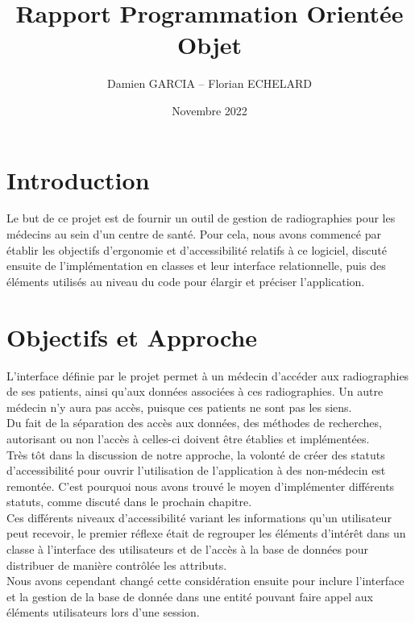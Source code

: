 \documentclass[12pt,a4paper]{article}
\begin{document}
	\title{Rapport Programmation Orientée Objet}
	\author{Damien GARCIA -- Florian ECHELARD}
	\date{Novembre 2022}
	\maketitle

	\begin{multicols}{2}

		\section{Introduction}	
		Le but de ce projet est de fournir un outil de gestion de radiographies pour les médecins au sein d'un centre de santé. Pour cela, nous avons commencé par établir les objectifs d'ergonomie et d'accessibilité relatifs à ce logiciel, discuté ensuite de l'implémentation en classes et leur interface relationnelle, puis des éléments utilisés au niveau du code pour élargir et préciser l'application.

		\section{Objectifs et Approche}
		L'interface définie par le projet permet à un médecin d'accéder aux radiographies de ses patients, ainsi qu'aux données associées à ces radiographies. Un autre médecin n'y aura pas accès, puisque ces patients ne sont pas les siens. \\
				
		Du fait de la séparation des accès aux données, des méthodes de recherches, autorisant ou non l'accès à celles-ci doivent être établies et implémentées. \\
				
		Très tôt dans la discussion de notre approche, la volonté de créer des statuts d'accessibilité pour ouvrir l'utilisation de l'application à des non-médecin est remontée. C'est pourquoi nous avons trouvé le moyen d'implémenter différents statuts, comme discuté dans le prochain chapitre. \\
				
		Ces différents niveaux d'accessibilité variant les informations qu'un utilisateur peut recevoir, le premier réflexe était de regrouper les éléments d'intérêt dans un classe à l'interface des utilisateurs et de l'accès à la base de données pour distribuer de manière contrôlée les attributs. \\
				
		Nous avons cependant changé cette considération ensuite pour inclure l'interface et la gestion de la base de donnée dans une entité pouvant faire appel aux éléments utilisateurs lors d'une session. \\
				

\end{multicols}
\end{document}

